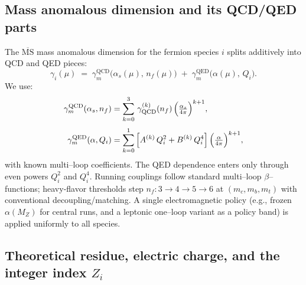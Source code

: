 \documentclass[aps,prd,onecolumn,amsmath,amssymb,superscriptaddress,nofootinbib,showpacs,showkeys]{revtex4-2}
\begin{document}
\subsection{Mass anomalous dimension and its QCD/QED parts}
The $\overline{\mathrm{MS}}$ mass anomalous dimension for the fermion species $i$ splits additively into QCD and QED pieces:
\begin{equation}
  \gamma_i(\mu)\;=\;\gamma_m^{\mathrm{QCD}}\!\bigl(\alpha_s(\mu),\,n_f(\mu)\bigr)\;+\;\gamma_m^{\mathrm{QED}}\!\bigl(\alpha(\mu),\,Q_i\bigr).
  \label{eq:gamma-split}
\end{equation}
We use:
\begin{align}
  \gamma_m^{\mathrm{QCD}}(\alpha_s,n_f)
  &=\sum_{k=0}^{3}\,\gamma^{(k)}_{\mathrm{QCD}}(n_f)\,
    \Bigl(\tfrac{\alpha_s}{4\pi}\Bigr)^{k+1},
  \label{eq:qcd-gamma-expansion}\\[3pt]
  \gamma_m^{\mathrm{QED}}(\alpha,Q_i)
  &=\sum_{k=0}^{1}\,\Bigl[A^{(k)}\,Q_i^{2}+B^{(k)}\,Q_i^{4}\Bigr]\,
    \Bigl(\tfrac{\alpha}{4\pi}\Bigr)^{k+1},
  \label{eq:qed-gamma-expansion}
\end{align}
with known multi–loop coefficients.
The QED dependence enters only through even powers $Q_i^{2}$ and $Q_i^{4}$. Running couplings follow standard multi–loop $\beta$–functions; heavy-flavor thresholds step $n_f:3\!\to\!4\!\to\!5\!\to\!6$ at $(m_c,m_b,m_t)$ with conventional decoupling/matching. A single electromagnetic policy (e.g., frozen $\alpha(M_Z)$ for central runs, and a leptonic one–loop variant as a policy band) is applied uniformly to all species.





\subsection{Theoretical residue, electric charge, and the integer index \texorpdfstring{$Z_i$}{Zi}}
\end{document}
